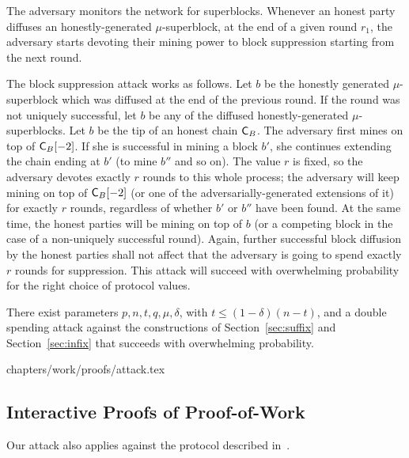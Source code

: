 The adversary monitors the network for superblocks. Whenever an honest party
diffuses an honestly-generated $\mu$-superblock,
at the end of a given round $r_1$, the adversary starts devoting their mining
power to block suppression starting from the next round.

The block suppression attack works as follows. Let $b$ be the honestly generated
$\mu$-\allowbreak superblock which was diffused at the end of the previous round. If the
round was not uniquely successful, let $b$ be any of the diffused
honestly-generated $\mu$-superblocks. Let $b$ be the tip of an honest chain
$\mathsf{C}_B$. The adversary first mines on top of $\mathsf{C}_B[-2]$. If she is
successful in mining a block $b'$, she continues extending the chain ending
at $b'$ (to mine $b''$ and so on). The value $r$ is fixed, so the adversary
devotes exactly $r$ rounds to this whole process; the adversary will keep mining
on top of $\mathsf{C}_B[-2]$ (or one of the adversarially-generated extensions of
it) for exactly $r$ rounds, regardless of whether $b'$ or $b''$ have been found.
At the same time, the honest parties will be mining on top of $b$ (or a
competing block in the case of a non-uniquely successful round). Again, further
successful block diffusion by the honest parties shall not affect that the
adversary is going to spend exactly $r$ rounds for suppression.
This attack will succeed with overwhelming probability for the right choice
of protocol values.

\begin{theorem}
There exist parameters
$p,\allowbreak n,\allowbreak t,\allowbreak q,\allowbreak \mu,\allowbreak \delta$, with $t\leq (1-\delta)(n-t)$,
and a double spending attack against the constructions of
Section~\ref{sec:suffix} and Section~\ref{sec:infix} that succeeds with
overwhelming probability.
\end{theorem}
{chapters/work/proofs/attack.tex}

\subsection{Interactive Proofs of Proof-of-Work}
Our attack also applies against the protocol described in~\cite{popow}.

